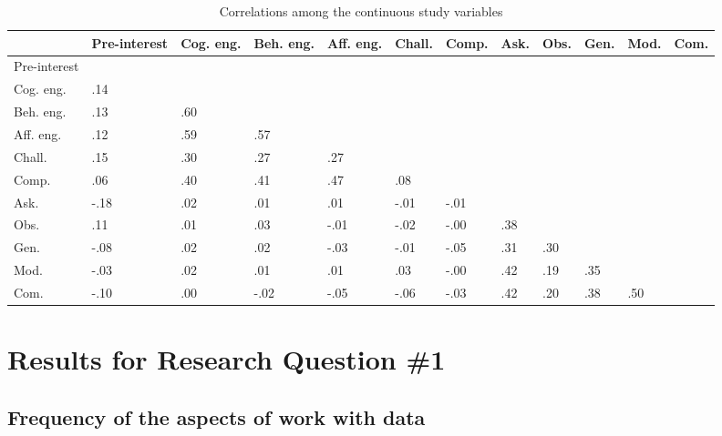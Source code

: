 \documentclass[]{msu-thesis}
\theoremstyle{definition}
\theoremstyle{definition}
\theoremstyle{definition}
\theoremstyle{remark}
\begin{document}
\begin{landscape}\begin{table}

\caption{\label{tab:unnamed-chunk-8}Correlations among the continuous study variables}
\centering
\begin{tabular}[t]{l>{\raggedright\arraybackslash}p{3em}>{\raggedright\arraybackslash}p{3em}>{\raggedright\arraybackslash}p{3em}>{\raggedright\arraybackslash}p{3em}>{\raggedright\arraybackslash}p{3em}>{\raggedright\arraybackslash}p{3em}>{\raggedright\arraybackslash}p{3em}>{\raggedright\arraybackslash}p{3em}>{\raggedright\arraybackslash}p{3em}>{\raggedright\arraybackslash}p{3em}>{\raggedright\arraybackslash}p{3em}}
\toprule
 & Pre-interest & Cog. eng. & Beh. eng. & Aff. eng. & Chall. & Comp. & Ask. & Obs. & Gen. & Mod. & Com.\\
\midrule
Pre-interest &  &  &  &  &  &  &  &  &  &  & \\
Cog. eng. & .14 &  &  &  &  &  &  &  &  &  & \\
Beh. eng. & .13 & .60 &  &  &  &  &  &  &  &  & \\
Aff. eng. & .12 & .59 & .57 &  &  &  &  &  &  &  & \\
Chall. & .15 & .30 & .27 & .27 &  &  &  &  &  &  & \\
Comp. & .06 & .40 & .41 & .47 & .08 &  &  &  &  &  & \\
Ask. & -.18 & .02 & .01 & .01 & -.01 & -.01 &  &  &  &  & \\
Obs. & .11 & .01 & .03 & -.01 & -.02 & -.00 & .38 &  &  &  & \\
Gen. & -.08 & .02 & .02 & -.03 & -.01 & -.05 & .31 & .30 &  &  & \\
Mod. & -.03 & .02 & .01 & .01 & .03 & -.00 & .42 & .19 & .35 &  & \\
Com. & -.10 & .00 & -.02 & -.05 & -.06 & -.03 & .42 & .20 & .38 & .50 & \\
\bottomrule
\end{tabular}
\end{table}
\end{landscape}

\section{Results for Research Question
\#1}\label{results-for-research-question-1}

\subsection{Frequency of the aspects of work with
data}\label{frequency-of-the-aspects-of-work-with-data}
\end{document}
